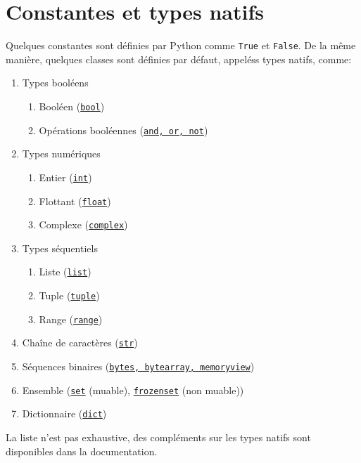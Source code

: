 \documentclass[a4paper, french, 10pt]{article}
\newcommand{\code}[1]{{\small\texttt{#1}}}
\begin{document}
\section{Constantes et types natifs}
 Quelques constantes sont définies par Python comme \code{True} et \code{False}. De la même manière, quelques classes sont définies par défaut, appeléss types natifs, comme:
\begin{enumerate}
		\item Types booléens
		\begin{enumerate}
			\item Booléen (\href{https://docs.python.org/fr/3/library/functions.html?highlight=bool#bool}{\code{bool}})
			\item Opérations booléennes (\href{https://docs.python.org/fr/3/library/stdtypes.html#boolean-operations-and-or-not}{\code{and, or, not}})
		\end{enumerate}
        \item Types numériques
        \begin{enumerate}
              \item Entier (\href{https://docs.python.org/fr/3/library/stdtypes.html#typesnumeric}{\code{int}})
              \item Flottant (\href{https://docs.python.org/fr/3/library/stdtypes.html#typesnumeric}{\code{float}})
              \item Complexe (\href{https://docs.python.org/fr/3/library/stdtypes.html#typesnumeric}{\code{complex}})
      \end{enumerate}
     \item Types séquentiels
	\begin{enumerate}
       \item Liste (\href{https://docs.python.org/fr/3/library/stdtypes.html#sequence-types-list-tuple-range}{\code{list}})
		\item Tuple (\href{https://docs.python.org/fr/3/library/stdtypes.html#sequence-types-list-tuple-range}{\code{tuple}})
		\item Range (\href{https://docs.python.org/fr/3/library/stdtypes.html#sequence-types-list-tuple-range}{\code{range}})
	\end{enumerate}
        \item Chaîne de caractères (\href{https://docs.python.org/fr/3/library/string.html?highlight=str#module-string}{\code{str}})
		\item Séquences binaires (\href{https://docs.python.org/fr/3/library/stdtypes.html#binary-sequence-types-bytes-bytearray-memoryview}{\code{bytes, bytearray, memoryview}})
		\item Ensemble (\href{https://docs.python.org/fr/3/library/stdtypes.html#set-types-set-frozenset}{\code{set}} (muable), \href{https://docs.python.org/fr/3/library/stdtypes.html#set-types-set-frozenset}{\code{frozenset}} (non muable))
		\item Dictionnaire (\href{https://docs.python.org/fr/3/library/stdtypes.html#mapping-types-dict}{\code{dict}})
\end{enumerate}
La liste n'est pas exhaustive, des compléments sur les types natifs sont disponibles dans la documentation.
\end{document}
